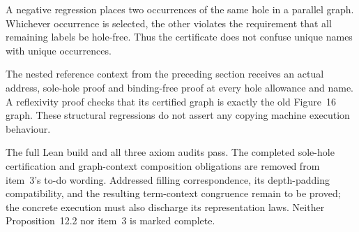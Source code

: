





A negative regression places two occurrences of the same hole in a parallel
graph. Whichever occurrence is selected, the other violates the requirement
that all remaining labels be hole-free. Thus the certificate does not confuse
unique names with unique occurrences.

The nested reference context from the preceding section receives an actual
address, sole-hole proof and binding-free proof at every hole allowance and
name. A reflexivity proof checks that its certified graph is exactly the
old Figure~16 graph. These structural regressions do not assert any copying
machine execution behaviour.







The full Lean build and all three axiom audits pass. The completed
sole-hole certification and graph-context composition obligations are removed
from item~3's to-do wording. Addressed filling correspondence, its depth-padding
compatibility, and the resulting term-context congruence remain to be proved;
the concrete execution must also discharge its representation laws. Neither
Proposition~12.2 nor item~3 is marked complete.
